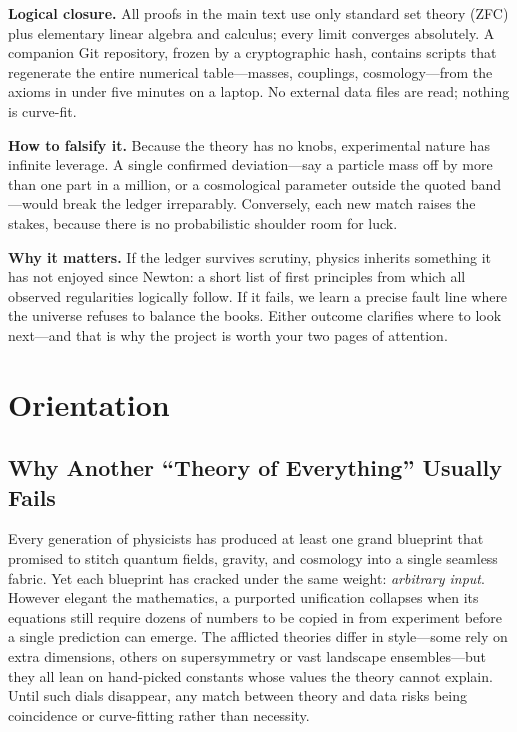 \documentclass[11pt]{article}
\begin{document}
\bigskip
\noindent
\textbf{Logical closure.}  
All proofs in the main text use only standard set theory (ZFC) plus elementary linear algebra and calculus; every limit converges absolutely.  A companion Git repository, frozen by a cryptographic hash, contains scripts that regenerate the entire numerical table—masses, couplings, cosmology—from the axioms in under five minutes on a laptop.  No external data files are read; nothing is curve-fit.

\bigskip
\noindent
\textbf{How to falsify it.}  
Because the theory has no knobs, experimental nature has infinite leverage.  A single confirmed deviation—say a particle mass off by more than one part in a million, or a cosmological parameter outside the quoted band—would break the ledger irreparably.  Conversely, each new match raises the stakes, because there is no probabilistic shoulder room for luck.

\bigskip
\noindent
\textbf{Why it matters.}  
If the ledger survives scrutiny, physics inherits something it has not enjoyed since Newton: a short list of first principles from which all observed regularities logically follow.  If it fails, we learn a precise fault line where the universe refuses to balance the books.  Either outcome clarifies where to look next—and that is why the project is worth your two pages of attention.

\section{Orientation}
\label{sec:orientation}

\subsection{Why Another ``Theory of Everything'' Usually Fails}
\label{subsec:why-toe-fails}

Every generation of physicists has produced at least one grand blueprint that promised to stitch quantum fields, gravity, and cosmology into a single seamless fabric.  Yet each blueprint has cracked under the same weight: \emph{arbitrary input}.  However elegant the mathematics, a purported unification collapses when its equations still require dozens of numbers to be copied in from experiment before a single prediction can emerge.  The afflicted theories differ in style—some rely on extra dimensions, others on supersymmetry or vast landscape ensembles—but they all lean on hand-picked constants whose values the theory cannot explain.  Until such dials disappear, any match between theory and data risks being coincidence or curve-fitting rather than necessity.
\end{document}
